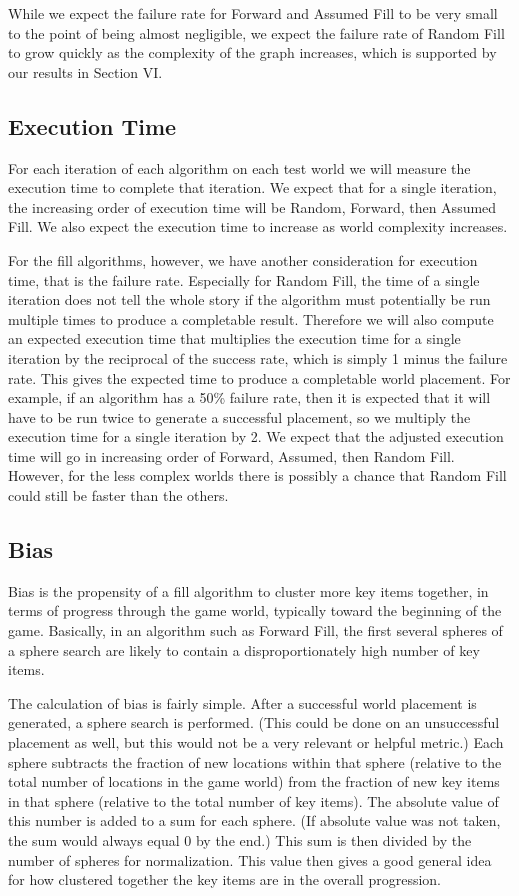 \documentclass{ieeeaccess}
\begin{document}
While we expect the failure rate for Forward and Assumed Fill to be very small to the point of
being almost negligible, we expect the failure rate of Random Fill to grow quickly 
as the complexity of the graph increases, which is supported by our results in Section VI.

\subsection{Execution Time}
For each iteration of each algorithm on each test world we will measure the execution time to
complete that iteration. We expect that for a single iteration, the increasing order of
execution time will be Random, Forward, then Assumed Fill. We also expect the execution time to
increase as world complexity increases.

For the fill algorithms, however, we have another consideration for execution time, that is the
failure rate. Especially for Random Fill, the time of a single iteration does not tell the
whole story if the algorithm must potentially be run multiple times to produce a completable
result. Therefore we will also compute an expected execution time that multiplies the execution
time for a single iteration by the reciprocal of the success rate, which is simply 1 minus the
failure rate. This gives the expected time to produce a completable world placement. For
example, if an algorithm has a 50\% failure rate, then it is expected that it will have to be
run twice to generate a successful placement, so we multiply the execution time for a single
iteration by 2. We expect that the adjusted execution time will go in increasing order of
Forward, Assumed, then Random Fill. However, for the less complex worlds there is possibly a
chance that Random Fill could still be faster than the others.

\subsection{Bias}
Bias is the propensity of a fill algorithm to cluster more key items together, in terms of
progress through the game world, typically toward the beginning of the game. Basically, in an
algorithm such as Forward Fill, the first several spheres of a sphere search are likely to
contain a disproportionately high number of key items.

The calculation of bias is fairly simple. After a successful world placement is generated, a
sphere search is performed. (This could be done on an unsuccessful placement as well, but this
would not be a very relevant or helpful metric.) Each sphere subtracts the fraction of new
locations within that sphere (relative to the total number of locations in the game world) from
the fraction of new key items in that sphere (relative to the total number of key items). The
absolute value of this number is added to a sum for each sphere. (If absolute value was not
taken, the sum would always equal 0 by the end.) This sum is then divided by the number of
spheres for normalization. This value then gives a good general idea for how clustered together
the key items are in the overall progression.
\end{document}
